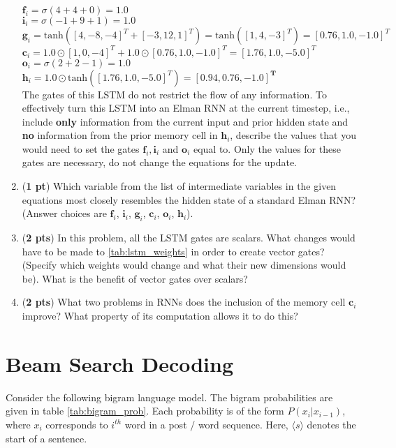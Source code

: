 \documentclass[11pt, letterpaper]{article}
\begin{document}
\begin{enumerate}[label=(\alph*)]
$\boldsymbol{f}_{i} = \sigma(4 + 4 + 0) = 1.0$ \\
\indent $\boldsymbol{i}_{i} = \sigma(-1 + 9 + 1) = 1.0$ \\
\indent $\boldsymbol{g}_{i} = \text{tanh}([4, -8, -4]^T + [-3, 12, 1]^T) = \text{tanh}([1,4,-3]^T) = [0.76, 1.0, -1.0]^T$\\
\indent $\boldsymbol{c}_{i} = 1.0 \odot [1,0,-4]^T + 1.0 \odot [0.76, 1.0, -1.0]^T = [1.76, 1.0, -5.0]^T $ \\
\indent $\boldsymbol{o}_{i} = \sigma(2 + 2 - 1) = 1.0$\\
\indent $\boldsymbol{h}_{i} = 1.0 \odot \text{tanh}([1.76, 1.0, -5.0]^T) = \mathbf{[0.94, 0.76, -1.0]^T}$\\

The gates of this LSTM do not restrict the flow of any information. To effectively turn this LSTM into an Elman RNN at the current timestep, i.e., include \textbf{only} information from the current input and prior hidden state and \textbf{no} information from the prior memory cell in $\boldsymbol{h}_{i}$, describe the values that you would need to set the gates $\boldsymbol{f}_{i}, \boldsymbol{i}_{i}$ and $\boldsymbol{o}_{i}$ equal to. Only the values for these gates are necessary, do not change the equations for the update.


\item (\textbf{1 pt})  Which variable from the list of intermediate variables in the given equations most closely resembles the hidden state of a standard Elman RNN? (Answer choices are $\boldsymbol{f}_{i}$, $\boldsymbol{i}_{i}$, $\boldsymbol{g}_{i}$, $\boldsymbol{c}_{i}$, $\boldsymbol{o}_{i}$, $\boldsymbol{h}_{i}$).


\item (\textbf{2 pts})  In this problem, all the LSTM gates are scalars. What changes would have to be made to \autoref{tab:lstm_weights} in order to create vector gates? (Specify which weights would change and what their new dimensions would be). What is the benefit of vector gates over scalars?


\item (\textbf{2 pts})   What two problems in RNNs does the inclusion of the memory cell $\boldsymbol{c}_{i}$ improve? What property of its computation allows it to do this?


\end{enumerate}

\newpage

\section{Beam Search Decoding}
Consider the following bigram language model. The bigram probabilities are given in table \ref{tab:bigram_prob}. Each probability is of the form $P(x_i|x_{i-1})$, where $x_i$ corresponds to $i^{th}$ word in a post / word sequence. Here, $\langle s \rangle$ denotes the start of a sentence.
\end{document}
